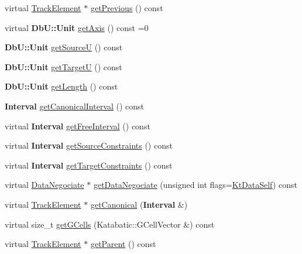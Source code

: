 \begin{DoxyCompactItemize}
\item 
virtual \hyperlink{classKite_1_1TrackElement}{Track\-Element} $\ast$ \hyperlink{classKite_1_1TrackElement_acbb9c965449bf4502d71149563cec0a2}{get\-Previous} () const 
\item 
virtual {\bf Db\-U\-::\-Unit} \hyperlink{classKite_1_1TrackElement_ac492fb5399691d81c31547db6b56fd03}{get\-Axis} () const =0
\item 
{\bf Db\-U\-::\-Unit} \hyperlink{classKite_1_1TrackElement_a3932d5ce9094ead510e4e33bd4e78e1a}{get\-Source\-U} () const 
\item 
{\bf Db\-U\-::\-Unit} \hyperlink{classKite_1_1TrackElement_a8e5f2a51f56c6bdb74024ac77c08a22a}{get\-Target\-U} () const 
\item 
{\bf Db\-U\-::\-Unit} \hyperlink{classKite_1_1TrackElement_a5370f2cf21823e1fa58d0627ee53c483}{get\-Length} () const 
\item 
{\bf Interval} \hyperlink{classKite_1_1TrackElement_ad78cfb34e7d8e92ba854fbc2dbf9d842}{get\-Canonical\-Interval} () const 
\item 
virtual {\bf Interval} \hyperlink{classKite_1_1TrackElement_a38d30a241d00a14943a06401d0d12923}{get\-Free\-Interval} () const 
\item 
virtual {\bf Interval} \hyperlink{classKite_1_1TrackElement_a972921aeb7f907194710ea35ac7600be}{get\-Source\-Constraints} () const 
\item 
virtual {\bf Interval} \hyperlink{classKite_1_1TrackElement_a00d398bdc1837c6c1e4847895c557829}{get\-Target\-Constraints} () const 
\item 
virtual \hyperlink{classKite_1_1DataNegociate}{Data\-Negociate} $\ast$ \hyperlink{classKite_1_1TrackElement_a76a45d5701f875711a03692e9bf6d5ce}{get\-Data\-Negociate} (unsigned int flags=\hyperlink{namespaceKite_acca8fffa3182dea5f94208f454f14b47a68e917ff37d4b5cef906303181836404}{Kt\-Data\-Self}) const 
\item 
virtual \hyperlink{classKite_1_1TrackElement}{Track\-Element} $\ast$ \hyperlink{classKite_1_1TrackElement_af2d46d64cbd02bdbba53d5483d95e26d}{get\-Canonical} ({\bf Interval} \&)
\item 
virtual size\-\_\-t \hyperlink{classKite_1_1TrackElement_a79b25d8199fe90446e99cf08d2d85674}{get\-G\-Cells} (Katabatic\-::\-G\-Cell\-Vector \&) const 
\item 
virtual \hyperlink{classKite_1_1TrackElement}{Track\-Element} $\ast$ \hyperlink{classKite_1_1TrackElement_ad1a03a36d5908ce44c3d0391ff9c7103}{get\-Parent} () const 
\item 

\end{DoxyCompactItemize}
